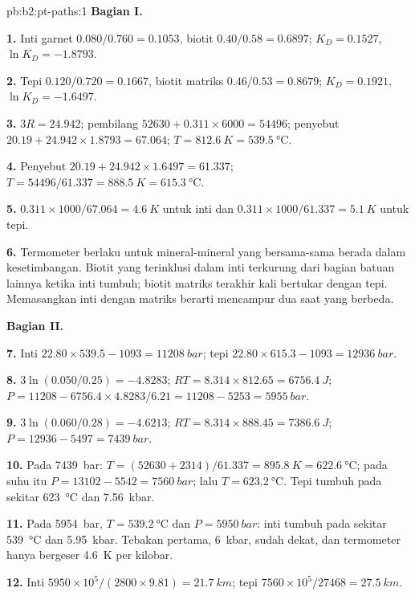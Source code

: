 \begin{solution}{pb:b2:pt-paths:1}
\noindent\textbf{Bagian I.}

\textbf{1.} Inti garnet $0.080/0.760 = 0.1053$, biotit $0.40/0.58 = 0.6897$; $K_D =
0.1527$, $\ln K_D = -1.8793$.

\textbf{2.} Tepi $0.120/0.720 = 0.1667$, biotit matriks $0.46/0.53 = 0.8679$; $K_D =
0.1921$, $\ln K_D = -1.6497$.

\textbf{3.} $3R = 24.942$; pembilang $52630 + 0.311\times6000 = 54496$; penyebut $20.19
+ 24.942\times1.8793 = 67.064$; $T = \qty{812.6}{K} = \qty{539.5}{\celsius}$.

\textbf{4.} Penyebut $20.19 + 24.942\times1.6497 = 61.337$; $T = 54496/61.337 =
\qty{888.5}{K} = \qty{615.3}{\celsius}$.

\textbf{5.} $0.311\times1000/67.064 = \qty{4.6}{K}$ untuk inti dan $0.311\times1000/61.337
= \qty{5.1}{K}$ untuk tepi.

\textbf{6.} Termometer berlaku untuk mineral-mineral yang bersama-sama berada dalam kesetimbangan.
Biotit yang terinklusi dalam inti terkurung dari bagian batuan lainnya ketika inti tumbuh;
biotit matriks terakhir kali bertukar dengan tepi. Memasangkan inti dengan matriks berarti mencampur
dua saat yang berbeda.

\noindent\textbf{Bagian II.}

\textbf{7.} Inti $22.80\times539.5 - 1093 = \qty{11208}{bar}$; tepi $22.80\times615.3 -
1093 = \qty{12936}{bar}$.

\textbf{8.} $3\ln(0.050/0.25) = -4.8283$; $RT = 8.314\times812.65 = \qty{6756.4}{J}$; $P =
11208 - 6756.4\times4.8283/6.21 = 11208 - 5253 = \qty{5955}{bar}$.

\textbf{9.} $3\ln(0.060/0.28) = -4.6213$; $RT = 8.314\times888.45 = \qty{7386.6}{J}$; $P
= 12936 - 5497 = \qty{7439}{bar}$.

\textbf{10.} Pada \qty{7439}{bar}: $T = (52630 + 2314)/61.337 = \qty{895.8}{K} =
\qty{622.6}{\celsius}$; pada suhu itu $P = 13102 - 5542 = \qty{7560}{bar}$; lalu $T
= \qty{623.2}{\celsius}$. Tepi tumbuh pada sekitar \qty{623}{\celsius} dan \qty{7.56}{kbar}.

\textbf{11.} Pada \qty{5954}{bar}, $T = \qty{539.2}{\celsius}$ dan $P = \qty{5950}{bar}$:
inti tumbuh pada sekitar \qty{539}{\celsius} dan \qty{5.95}{kbar}. Tebakan pertama,
\qty{6}{kbar}, sudah dekat, dan termometer hanya bergeser \qty{4.6}{K} per kilobar.

\textbf{12.} Inti $5950\times10^5/(2800\times9.81) = \qty{21.7}{km}$; tepi
$7560\times10^5/27468 = \qty{27.5}{km}$.


\end{solution}
